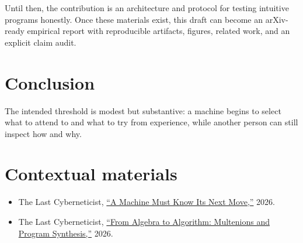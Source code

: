 \documentclass[11pt]{article}
\begin{document}
Until then, the contribution is an architecture and protocol for testing
intuitive programs honestly. Once these materials exist, this draft can become
an arXiv-ready empirical report with reproducible artifacts, figures, related
work, and an explicit claim audit.

\section{Conclusion}

The intended threshold is modest but substantive: a machine begins to select
what to attend to and what to try from experience, while another person can
still inspect how and why.

\section*{Contextual materials}
\begin{itemize}[leftmargin=1.5em]
\item The Last Cyberneticist, \href{https://www.spreaker.com/episode/a-machine-must-know-its-next-move--75639925}{``A Machine Must Know Its Next Move,''} 2026.
\item The Last Cyberneticist, \href{https://www.spreaker.com/episode/from-algebra-to-algorithm-multenions-and-program-synthesis--75480441}{``From Algebra to Algorithm: Multenions and Program Synthesis,''} 2026.
\end{itemize}



\end{document}
